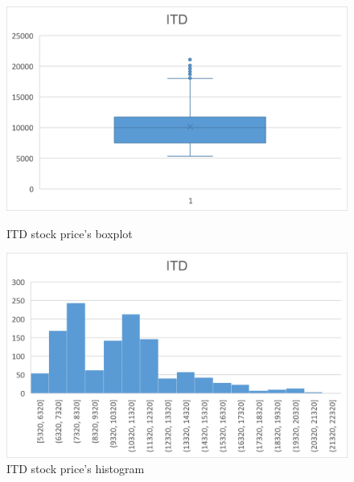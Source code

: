 \documentclass{ieeeojies}
\begin{document}
\begin{figure}[H]
    \centering
    \begin{minipage}{0.23\textwidth}
        \centering
        \includegraphics[width=1\textwidth]{bibliography/Figure/ITD_Quantiles.png}
        \caption{ITD stock price's boxplot}
        \label{fig:1}
    \end{minipage}
    \hfill
    \begin{minipage}{0.23\textwidth}
        \centering
        \includegraphics[width=1\textwidth]{bibliography/Figure/ITD_Bar.png}
        \caption{ITD stock price's histogram}
        \label{fig:2}
    \end{minipage}
\end{figure}
\end{document}

